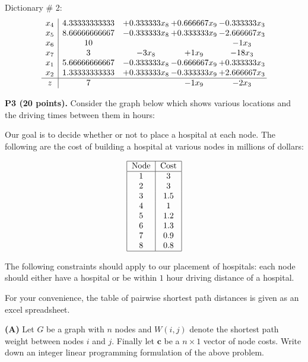 \documentclass[11pt]{article}
\begin{document}
Dictionary \# 2: 
\[\begin{array}{c| c c@{\hskip 2pt} c@{\hskip 2pt} c@{\hskip 2pt} }
 x_{4}   &  4.33333333333 & + 0.333333 x_{8} & + 0.666667 x_{9} & -0.333333 x_{3}\\
 x_{5}   &  8.66666666667 & -0.333333 x_{8} & + 0.333333 x_{9} & -2.666667 x_{3}\\
 x_{6}   &  10  &    &   & -1  x_{3}\\
 x_{7}   &  3 & -3  x_{8} & + 1  x_{9} & -18  x_{3}\\
 x_{1}   &  5.66666666667 & -0.333333 x_{8} & -0.666667 x_{9} & + 0.333333 x_{3}\\
 x_{2}   &  1.33333333333 & + 0.333333 x_{8} & -0.333333 x_{9} & + 2.666667 x_{3}\\
\hline
z    &  7  &   & -1  x_{9} & -2  x_{3}\\
\end{array}\]

\medskip

\noindent\textbf{P3 (20 points).}  Consider the graph below
which shows various locations and the driving times between them in hours:

\begin{center}
\end{center}

Our goal is to decide whether or not to place a hospital at each node.
The following are the cost of building a hospital at various nodes
in millions of dollars:

\[\begin{tabular}{|c|c|}
\hline
\mbox{Node} & \mbox{Cost}\\
\hline
1 & 3 \\
2 & 3 \\
3 & 1.5 \\
4 & 1 \\
5 & 1.2 \\
6 & 1.3 \\
7 & 0.9 \\
8 & 0.8 \\
\hline
\end{tabular}\]

The following constraints should apply to our placement of hospitals:
each node should either have a hospital or be within $1$ hour driving
distance of a hospital.

For your convenience, the table of pairwise shortest path distances is given 
as an excel spreadsheet.

\noindent\textbf{(A)} Let $G$ be a graph with $n$ nodes
and $W(i,j)$ denote the shortest path weight between nodes $i$ and $j$.
Finally let $\mathbf{c}$ be a $n \times 1$ vector of node costs.
Write down an integer linear programming formulation of the above problem.
\end{document}
